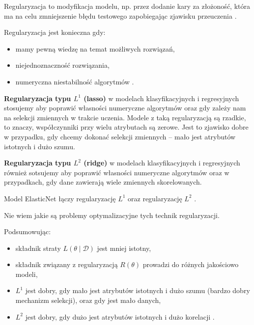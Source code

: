 \documentclass[wi]{zut}
\begin{document}
Regularyzacja to modyfikacja modelu, np. przez dodanie kary za złożoność, która ma na celu zmniejszenie błędu testowego zapobiegając zjawisku przeuczenia \cite{wiki:Regularization}.

Regularyzacja jest konieczna gdy:

\begin{itemize}
    \item mamy pewną wiedzę na temat możliwych rozwiązań,
    \item niejednoznaczność rozwiązania,
    \item numeryczna niestabilność algorytmów \cite{Korzen2020_12}.
\end{itemize}
\question

\textbf{Regularyzacja typu $L^1$ (lasso)} w modelach klasyfikacyjnych i regresyjnych stosujemy aby poprawić własności numeryczne algorytmów oraz gdy zależy nam na selekcji zmiennych w trakcie uczenia. Modele z taką regularyzacją są rzadkie, to znaczy, współczynniki przy wielu atrybutach są zerowe. Jest to zjawisko dobre w przypadku, gdy chcemy dokonać selekcji zmiennych -- mało jest atrybutów istotnych i dużo szumu.

\textbf{Regularyzacja typu $L^2$ (ridge)} w modelach klasyfikacyjnych i regresyjnych również sotsujemy aby poprawić własności numeryczne algorytmów oraz w przypadkach, gdy dane zawierają wiele zmiennych skorelowanych.

Model ElasticNet łączy regularyzację $L^1$ oraz regularyzację $L^2$ \cite{wiki:Elastic_net_regularization}. 

Nie wiem jakie są problemy optymalizacyjne tych technik regularyzacji.
\question

Podsumowując:

\begin{itemize}
    \item składnik straty $L(\theta \mid \mathscr{D})$ jest mniej istotny,
    \item składnik związany z regularyzacją $R(\theta)$ prowadzi do różnych jakościowo modeli,
    \item $L^1$ jest dobry, gdy mało jest atrybutów istotnych i dużo szumu (bardzo dobry mechanizm selekcji), oraz gdy jest mało danych,
    \item $L^2$ jest dobry, gdy dużo jest atrybutów istotnych i dużo korelacji \cite{Korzen2020_12}.
\end{itemize}

\printbibliography[heading=bibintoc]

\appendix
\end{document}

